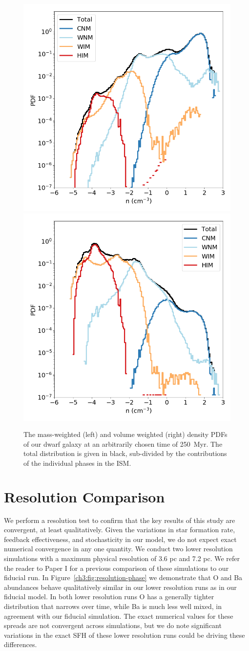 \begin{figure}
\centering
\includegraphics[width=0.475\linewidth]{figures/ch3/density_PDF}
\includegraphics[width=0.475\linewidth]{figures/ch3/density_PDF_volume_weighted}\caption{The mass-weighted (left) and volume weighted (right) density PDFs of our dwarf galaxy at an arbitrarily chosen time of 250~Myr. The total distribution is given in black, sub-divided by the contributions of the individual phases in the ISM.}
\label{ch3:fig:density_pdf}
\end{figure}

\section{Resolution Comparison}
We perform a resolution test to confirm that the key results of this study are convergent, at least qualitatively. Given the variations in star formation rate, feedback effectiveness, and stochasticity in our model, we do not expect exact numerical convergence in any one quantity. We conduct two lower resolution simulations with a maximum physical resolution of 3.6 pc and 7.2 pc. We refer the reader to Paper I for a previous comparison of these simulations to our fiducial run. In Figure~\ref{ch3:fig:resolution-phase} we demonstrate that O and Ba abundances behave qualitatively similar in our lower resolution runs as in our fiducial model. In both lower resolution runs O has a generally tighter distribution that narrows over time, while Ba is much less well mixed, in agreement with our fiducial simulation. The exact numerical values for these spreads are not convergent across simulations, but we do note significant variations in the exact SFH of these lower resolution runs could be driving these differences.

